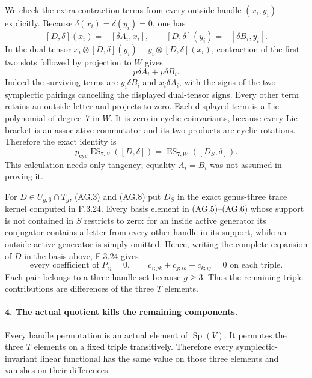 We check the extra contraction terms from every
outside handle $(x_i,y_i)$ explicitly. Because
$\delta(x_i)=\delta(y_i)=0$, one has
\[
 [D,\delta](x_i)=-[\delta A_i,x_i],\qquad
 [D,\delta](y_i)=-[\delta B_i,y_i].
\]
In the dual tensor
$x_i\otimes[D,\delta](y_i)
 -y_i\otimes[D,\delta](x_i)$, contraction of
the first two slots followed by projection to
$W$ gives
\[
                           p\delta A_i+p\delta B_i.
\]
Indeed the surviving terms are $y_i\delta B_i$
and $x_i\delta A_i$, with the signs of the two
symplectic pairings cancelling the displayed
dual-tensor signs. Every other term retains an
outside letter and projects to zero. Each
displayed term is a Lie polynomial of degree~7
in $W$. It is zero in cyclic coinvariants,
because every Lie bracket is an associative
commutator and its two products are cyclic
rotations. Therefore the exact identity is
\[
 p_{\mathrm{cyc}}\operatorname{ES}_{7,V}([D,\delta])
       =\operatorname{ES}_{7,W}([D_S,\delta]).              \tag{AG.8}
\]
This calculation needs only tangency; equality
$A_i=B_i$ was not assumed in proving it.

For $D\in U_{g,6}\cap T_g$, (AG.3) and (AG.8)
put $D_S$ in the exact genus-three trace kernel
computed in F.3.24. Every basis element in
(AG.5)--(AG.6) whose support is not contained
in $S$ restricts to zero: for an inside active
generator its conjugator contains a letter
from every other handle in its support, while
an outside active generator is simply omitted.
Hence, writing the complete expansion of $D$
in the basis above, F.3.24 gives
\[
    \text{every coefficient of }P_{ij}=0,
    \qquad
    c_{i;jk}+c_{j;ik}+c_{k;ij}=0
    \text{ on each triple}.                               \tag{AG.9}
\]
Each pair belongs to a three-handle set because
$g\geq3$. Thus the remaining triple contributions
are differences of the three $T$ elements.

\paragraph{4. The actual quotient kills the remaining components.}
Every handle permutation is an actual element of
$\operatorname{Sp}(V)$. It permutes the three
$T$ elements on a fixed triple transitively.
Therefore every symplectic-invariant linear
functional has the same value on those three
elements and vanishes on their differences.

